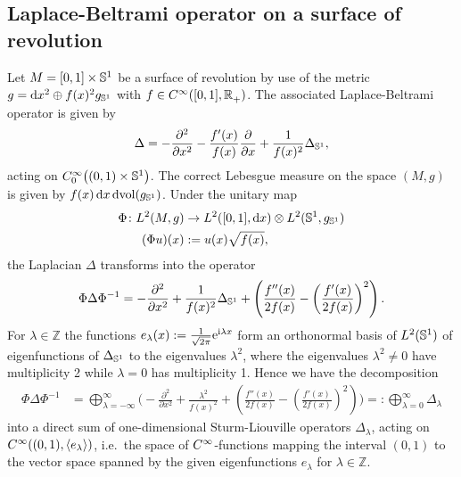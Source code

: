 \subsection{Laplace-Beltrami operator on a surface of revolution}
\label{sec:laplace-beltrami}
Let $M = [0,1]\times\Sphere{1}$ be a surface of revolution by use of the metric
$g = \mathrm dx^2 \oplus f(x)^2 g_\Sphere{1}$ with $f\in \Cinf([0,1],
\Rplus)$. The associated Laplace-Beltrami operator is given by
\begin{align}
  \Delta = -\frac{\partial^2}{\partial x^2} -
            \frac{f'(x)}{f(x)}\frac{\partial}{\partial x} +
            \frac{1}{f(x)^2}\Delta_\Sphere1,
  \label{eqn:laplace}
\end{align}
acting on $\Cinf[0]\bigl((0,1)\times\Sphere1\bigr)$. The correct Lebesgue
measure on the space $(M,g)$ is given by $f(x)\,\mathrm dx\, \mathrm
d\!\vol(g_\Sphere1)$. Under the unitary map
\begin{align*}
  \Phi\colon L^2(M, g)&\to L^2([0,1], \mathrm dx)\otimes L^2(\Sphere1,
  g_\Sphere1) \\ (\Phi u)(x) &:= u(x) \sqrt{f(x)},
\end{align*}
the Laplacian $\Delta$ transforms into the operator
\begin{align*}
  \Phi\Delta\Phi^{-1} = -\frac{\partial^2}{\partial x^2} +
  \frac{1}{f(x)^2}\Delta_\Sphere1 + \left( \frac{f''(x)}{2f(x)} -
  \left(\frac{f'(x)}{2f(x)}\right)^2\right).
\end{align*}
For $\lambda\in\mathbb{Z}$ the functions $e_\lambda(x) :=
\frac{1}{\sqrt{2\pi}}\Eto{\mathrm i\lambda x}$ form an orthonormal basis of
$L^2(\Sphere1)$ of eigenfunctions of $\Delta_\Sphere1$ to the eigenvalues
$\lambda^2$, where the eigenvalues $\lambda^2 \neq 0$ have multiplicity 2 while
$\lambda = 0$ has multiplicity 1. Hence we have the decomposition
\begin{align}
  \label{eqn:lpl-decomp}
  \Phi\Delta\Phi^{-1} &= \bigoplus_{\lambda=-\infty}^{\infty} \Biggl(
    -\frac{\partial^2}{\partial x^2} + \frac{\lambda^2}{f(x)^2} + 
     \left( \frac{f''(x)}{2f(x)} -
     \left(\frac{f'(x)}{2f(x)}\right)^2\right)\Biggr)
     =: \bigoplus_{\lambda=0}^{\infty}\Delta_\lambda
\end{align}
into a direct sum of one-dimensional Sturm-Liouville operators $\Delta_\lambda$,
acting on $\Cinf((0,1),\langle e_\lambda\rangle)$, i.e.\ the space of
$\Cinf$-functions mapping the interval $(0,1)$ to the vector space spanned by
the given eigenfunctions $e_\lambda$ for $\lambda\in\mathbb{Z}$.

